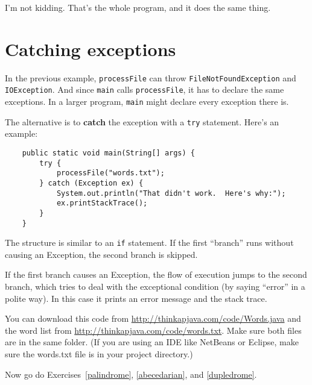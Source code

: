 I'm not kidding.  That's the whole program, and it does the same thing.


\section{Catching exceptions}

In the previous example, {\tt processFile} can throw
{\tt FileNotFoundException} and {\tt IOException}.  And since
{\tt main} calls {\tt processFile}, it has to declare the
same exceptions.  In a larger program, {\tt main} might
declare every exception there is.

The alternative is to {\bf catch} the exception with a
{\tt try} statement.  Here's an example:

\begin{lstlisting}
    public static void main(String[] args) {
        try {
            processFile("words.txt");
        } catch (Exception ex) {
            System.out.println("That didn't work.  Here's why:");
            ex.printStackTrace();
        }
    }
\end{lstlisting}

The structure is similar to an {\tt if} statement.  If the first
``branch'' runs without causing an Exception, the second branch
is skipped.

If the first branch causes an Exception, the flow of execution jumps
to the second branch, which tries to deal with the exceptional
condition (by saying ``error'' in a polite way).  In this case it prints
an error message and the stack trace.

You can download this code from
\url{http://thinkapjava.com/code/Words.java}
and the word list from
\url{http://thinkapjava.com/code/words.txt}.
Make sure both files are in the same folder.
(If you are using an IDE like NetBeans or Eclipse, make
sure the words.txt file is in your project directory.)

Now go do Exercises~\ref{palindrome}, \ref{abecedarian}, and \ref{dupledrome}.



